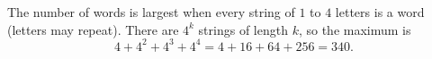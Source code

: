 The number of words is largest when every string of $1$ to $4$ letters is a word (letters may repeat). There are $4^k$ strings of length $k$, so the maximum is
\[
4+4^2+4^3+4^4=4+16+64+256=\boxed{340}.
\]
